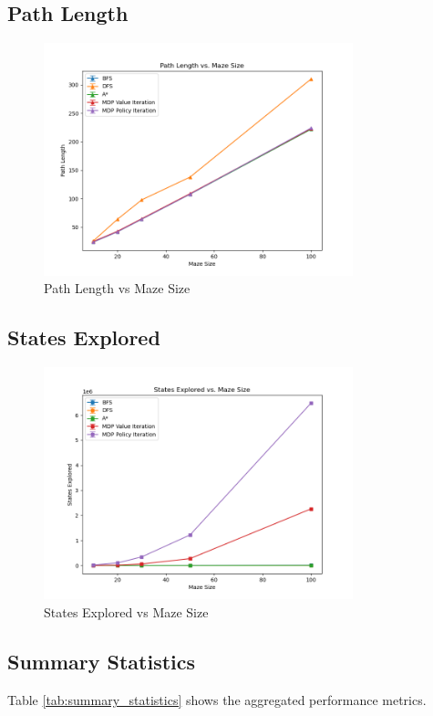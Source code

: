 \documentclass{article}
\begin{document}
\subsection{Path Length}
\begin{figure}[h]
    \centering
    \includegraphics[width=0.8\textwidth]{analysis_plots/path_length.png}
    \caption{Path Length vs Maze Size}
\end{figure}

\subsection{States Explored}
\begin{figure}[h]
    \centering
    \includegraphics[width=0.8\textwidth]{analysis_plots/states_explored.png}
    \caption{States Explored vs Maze Size}
\end{figure}

\subsection{Summary Statistics}
Table \ref{tab:summary_statistics} shows the aggregated performance metrics.
\end{document}
